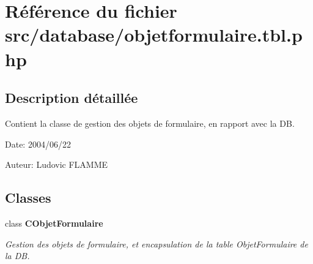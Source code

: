 \section{Référence du fichier src/database/objetformulaire.tbl.php}
\label{objetformulaire_8tbl_8php}


\subsection{Description détaillée}
Contient la classe de gestion des objets de formulaire, en rapport avec la DB. 

\begin{Desc}
\item[Date:]2004/06/22\end{Desc}
\begin{Desc}
\item[Auteur:]Ludovic FLAMME \end{Desc}


\subsection*{Classes}
\begin{CompactItemize}
\item 
class {\bf CObjetFormulaire}
\begin{CompactList}\small\item\em Gestion des objets de formulaire, et encapsulation de la table ObjetFormulaire de la DB. \item\end{CompactList}\end{CompactItemize}
